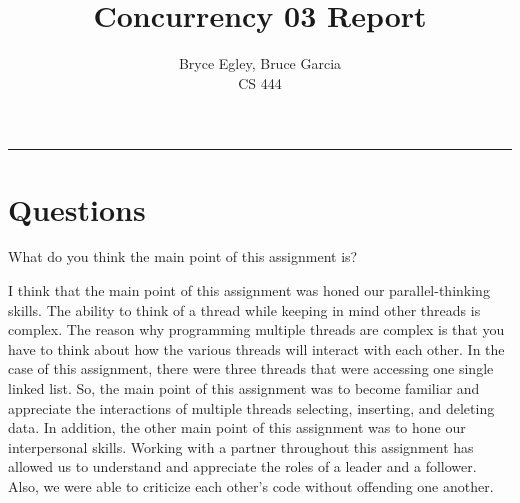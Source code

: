 \documentclass{article}
\newenvironment{question}[2][Question]{\begin{trivlist}
\item[\hskip \labelsep {\bfseries #1}\hskip \labelsep {\bfseries #2.}]}{\end{trivlist}}
\begin{document}

\title{Concurrency 03 Report} %
\author{Bryce Egley, Bruce Garcia\\CS 444} %

\maketitle
\hrule


%
%

\section*{Questions}

\begin{question}{1}
What do you think the main point of this assignment is?
\end{question}
I think that the main point of this assignment was honed our parallel-thinking skills. The ability to think of a thread while keeping in mind other threads is complex. The reason why programming multiple threads are complex is that you have to think about how the various threads will interact with each other. In the case of this assignment, there were three threads that were accessing one single linked list. So, the main point of this assignment was to become familiar and appreciate the interactions of multiple threads selecting, inserting, and deleting data. In addition, the other main point of this assignment was to hone our interpersonal skills. Working with a partner throughout this assignment has allowed us to understand and appreciate the roles of a leader and a follower. Also, we were able to criticize each other's code without offending one another. 
\end{document}

